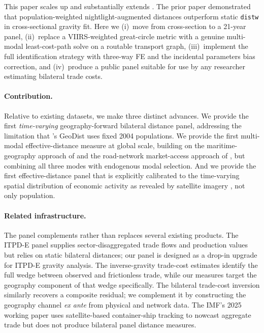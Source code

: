 \documentclass[11pt, a4paper]{article}
\begin{document}
This paper scales up and substantially extends \citet{gonchar_helfrich_2025}.
The prior paper demonstrated that population-weighted nightlight-augmented
distances outperform static \texttt{distw} in cross-sectional gravity fit.
Here we (i)~move from cross-section to a 21-year panel, (ii)~replace a
VIIRS-weighted great-circle metric with a genuine multi-modal least-cost-path
solve on a routable transport graph, (iii)~implement the full identification
strategy with three-way FE and the \citet{weidner_zylkin_2021} incidental
parameters bias correction, and (iv)~produce a public panel suitable for use
by any researcher estimating bilateral trade costs.

\medskip
\paragraph*{Contribution.}
Relative to existing datasets, we make three distinct advances.
We provide the first \emph{time-varying} geography-forward bilateral distance
panel, addressing the limitation that \citet{mayer_zignago_2011}'s GeoDist
uses fixed 2004 populations.
We provide the first multi-modal effective-distance measure at global scale,
building on the maritime-geography approach of
\citet{brancaccio_kalouptsidi_papageorgiou_2020} and the road-network
market-access approach of \citet{donaldson_hornbeck_2016}, but combining all
three modes with endogenous modal selection.
And we provide the first effective-distance panel that is explicitly calibrated
to the time-varying spatial distribution of economic activity as revealed by
satellite imagery \citep{henderson_storeygard_weil_2012,
elvidge_zhizhin_ghosh_baugh_hsu_2021, li_zhou_zhao_zhao_2020},
not only population.

\medskip
\paragraph*{Related infrastructure.}
The panel complements rather than replaces several existing products.
The \citet{borchert_larch_shikher_yotov_2022} ITPD-E panel supplies
sector-disaggregated trade flows and production values but relies on static
bilateral distances; our panel is designed as a drop-in upgrade for ITPD-E
gravity analysis.
The \citet{arvis_duval_shepherd_utoktham_2013} inverse-gravity trade-cost
estimates identify the full wedge between observed and frictionless trade, while
our measures target the geography component of that wedge specifically.
The \citet{novy_2013} bilateral trade-cost inversion similarly recovers a composite
residual; we complement it by constructing the geography channel \emph{ex ante}
from physical and network data.
The IMF's 2025 working paper \citep{imf_wp_25_93} uses satellite-based
container-ship tracking to nowcast aggregate trade but does not produce
bilateral panel distance measures.
\end{document}

